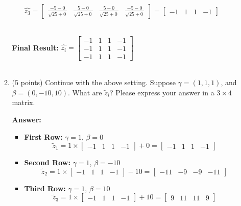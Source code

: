 \documentclass[11pt]{article}
\begin{document}
\begin{enumerate}
\begin{enumerate}
\begin{itemize}
        $\hat{z_3} = \begin{bmatrix}
            \frac{-5-0}{\sqrt{25+0}}&\frac{5-0}{\sqrt{25+0}}&\frac{5-0}{\sqrt{25+0}}&\frac{-5-0}{\sqrt{25+0}}\end{bmatrix} = \begin{bmatrix}
                -1&1&1&-1
            \end{bmatrix}$\\\\
    \end{itemize}

    \textbf{Final Result: } $\hat{z_i} = \begin{bmatrix}
        -1&1&1&-1\\-1&1&1&-1\\-1&1&1&-1
    \end{bmatrix}$\\\\
    
    \item (5 points) Continue with the above setting. Suppose
    $\gamma=(1,1,1)$, and $\beta=(0,-10,10)$. What are $\tilde
    z_i$? Please express your answer in a $3\times 4$ matrix.

    \textbf{Answer: }

    \begin{itemize}
        \item \textbf{First Row: }
        $\gamma = 1$, $\beta = 0$\\
        \[\tilde z_1 = 1 \times \begin{bmatrix}
            -1&1&1&-1
        \end{bmatrix} + 0 = \begin{bmatrix}
            -1&1&1&-1
        \end{bmatrix}\]
    \end{itemize}

    \begin{itemize}
        \item \textbf{Second Row: }
        $\gamma = 1$, $\beta = -10$\\
        \[\tilde z_2 = 1 \times \begin{bmatrix}
            -1&1&1&-1
        \end{bmatrix} -10 = \begin{bmatrix}
            -11&-9&-9&-11
        \end{bmatrix}\]
    \end{itemize}

    \begin{itemize}
        \item \textbf{Third Row: }
        $\gamma = 1$, $\beta = 10$\\
        \[\tilde z_3 = 1 \times \begin{bmatrix}
            -1&1&1&-1
        \end{bmatrix} + 10 = \begin{bmatrix}
            9&11&11&9
        \end{bmatrix}\]\\
    \end{itemize}


\end{enumerate}
\end{enumerate}
\end{document}
